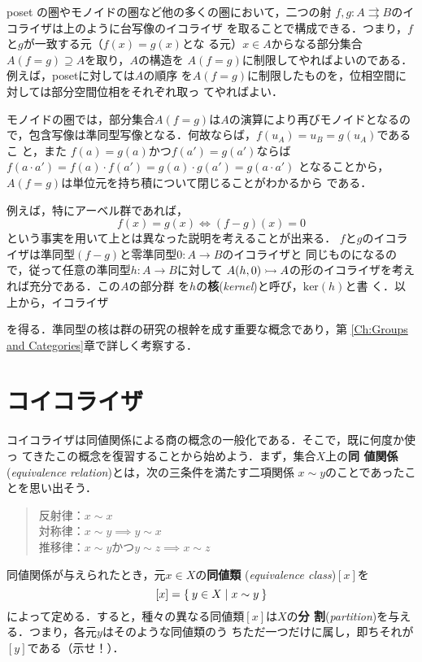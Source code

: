\begin{example}
 poset の圏やモノイドの圏など他の多くの圏において，二つの射
 $f, g: A \rightrightarrows B$のイコライザは上のように台写像のイコライザ
 を取ることで構成できる．つまり，$f$と$g$が一致する元（$f(x) = g(x)$とな
 る元）$x \in A$からなる部分集合$A(f=g) \supseteq A$を取り，$A$の構造を
 $A(f=g)$に制限してやればよいのである．例えば，posetに対しては$A$の順序
 を$A(f=g)$に制限したものを，位相空間に対しては部分空間位相をそれぞれ取っ
 てやればよい．

 モノイドの圏では，部分集合$A(f=g)$は$A$の演算により再びモノイドとなるの
 で，包含写像は準同型写像となる．何故ならば，$f(u_A) = u_B = g(u_A)$であるこ
 と，また $f(a) = g(a)$かつ$f(a') = g(a')$ならば
 $f(a \cdot a') = f(a) \cdot f(a') = g(a) \cdot g(a') = g(a \cdot a')$
 となることから，$A(f=g)$は単位元を持ち積について閉じることがわかるから
 である．

 例えば，特にアーベル群であれば，
 \[
  f(x) = g(x) \iff (f - g)(x) = 0
 \]
 という事実を用いて上とは異なった説明を考えることが出来る．
 $f$と$g$のイコライザは準同型$(f-g)$と零準同型$0: A \to B$のイコライザと
 同じものになるので，従って任意の準同型$h: A\to B$に対して
 $A(h, 0) \rightarrowtail A$の形のイコライザを考えれば充分である．この$A$の部分群
 を$h$の{\bfseries 核}({\itshape kernel})と呼び，$\mathrm{ker}(h)$と書
 く．以上から，イコライザ
 \begin{center}
 \end{center}
 を得る．準同型の核は群の研究の根幹を成す重要な概念であり，第
 \ref{Ch:Groups and Categories}章で詳しく考察する．
\end{example}
\label{Sec:Equalizer}
\section{コイコライザ}
\label{Sec:Coequalizer}
コイコライザは同値関係による商の概念の一般化である．そこで，既に何度か使っ
てきたこの概念を復習することから始めよう．まず，集合$X$上の{\bfseries 同
値関係}({\itshape equivalence relation})とは，次の三条件を満たす二項関係
$x \sim y$のことであったことを思い出そう．
\begin{quote}
 反射律：$x \sim x$\\
 対称律：$x \sim y \implies y \sim x$\\
 推移律：$x \sim y \text{かつ} y \sim z \implies x \sim z$
\end{quote}
同値関係が与えられたとき，元$x \in X$の{\bfseries 同値類}
({\itshape equivalence class})$[x]$を
\[
 [x] = \Set{y \in X | x \sim y}
\]
によって定める．すると，種々の異なる同値類$[x]$は$X$の{\bfseries 分
割}({\itshape partition})を与える．つまり，各元$y$はそのような同値類のう
ちただ一つだけに属し，即ちそれが$[y]$である（示せ！）．

